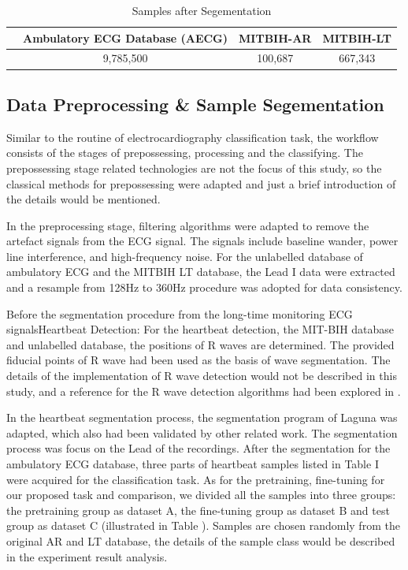\documentclass[journal]{IEEEtran}
\begin{document}
\begin{table}[!htbp]
\begin{center}
\begin{threeparttable}
\caption{Samples after Segementation}

\label{table2}
\begin{tabular}{cccc}
\hline
& Ambulatory ECG Database (AECG) & MITBIH-AR &  MITBIH-LT\\
\hline
& 9,785,500 & 100,687 &  667,343 \\
\hline
\end{tabular}
\end{threeparttable}
\end{center}
\end{table}


\subsection{Data Preprocessing \& Sample Segementation}
Similar to the routine of electrocardiography classification task, the workflow consists of the stages of prepossessing, processing  and the classifying. The prepossessing stage related technologies are not the focus of this study, so the classical methods for prepossessing were adapted and just a brief introduction of the details would be mentioned. 

In the preprocessing stage, filtering algorithms were adapted to remove the artefact signals from the ECG signal. The signals include baseline wander, power line interference, and high-frequency noise. For the unlabelled database of ambulatory ECG and the MITBIH LT database, the Lead I data were extracted and a resample from 128Hz to 360Hz procedure was adopted for data consistency.

Before the segmentation procedure from the long-time monitoring ECG signalsHeartbeat Detection: For the heartbeat detection, the MIT-BIH database and unlabelled database, the positions of R waves are determined. The provided fiducial points of R wave had been used as the basis of wave segmentation. The details of the implementation of R wave detection would not be described in this study, and a reference for the R wave detection algorithms had been explored in \cite{afonso}.

In the heartbeat segmentation process, the segmentation program of Laguna \cite{sornmo2006electrocardiogram} was adapted, which also had been validated by other related work\cite{chaza}. The segmentation process was focus on the Lead  \uppercase\expandafter{} of the recordings. After the segmentation for the ambulatory ECG database, three parts of heartbeat samples listed in Table I were acquired for the classification task. As for the pretraining, fine-tuning for our proposed task and comparison, we divided all the samples into three groups: the pretraining group as dataset A, the fine-tuning group as dataset B and test group as dataset C (illustrated in Table \uppercase\expandafter{}). Samples are chosen randomly from the original AR and LT database, the details of the sample class would be described in the experiment result analysis.
\end{document}
